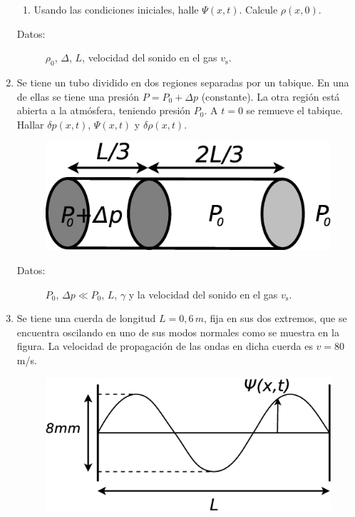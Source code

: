 \documentclass[11pt,spanish]{article}
\begin{document}
\begin{enumerate}
\begin{enumerate}
        \item Usando las condiciones iniciales, halle $\Psi(x,t)$. Calcule
        $\rho(x,0)$.
    \end{enumerate}

    \begin{description}
        \item [{Datos:}] $\rho_{0}$, $\Delta$, $L$, velocidad del sonido en el
        gas $v_\text{s}$.
    \end{description}


    \item Se tiene un tubo dividido en dos regiones separadas por un tabique.
    En una de ellas se tiene una presión $P=P_{0}+\Delta p$ (constante). La otra
    región está abierta a la atmósfera, teniendo presión $P_{0}$. A $t=0$ se
    remueve el tabique. Hallar $\delta p(x,t)$, $\Psi(x,t)$ y $\delta\rho(x,t)$.

    \begin{figure}[H]
        \centering{}\includegraphics[clip,scale=0.25]{figs/ej1-31}
    \end{figure}

    \begin{description}
        \item [{Datos:}] $P_{0}$, $\Delta p\ll P_{0}$, $L$, $\gamma$ y la
        velocidad del sonido en el gas $v_\text{s}$.
    \end{description}


    \item Se tiene una cuerda de longitud $L=0,6\unit{\, m}$, fija en sus dos
    extremos, que se encuentra oscilando en uno de sus modos normales como se
    muestra en la figura. La velocidad de propagación de las ondas en dicha
    cuerda es $v=80$ m/s.

    \begin{figure}[H]
        \centering{}\includegraphics[clip,scale=0.25]{figs/ej1-32}
    \end{figure}


\end{enumerate}
\end{document}
